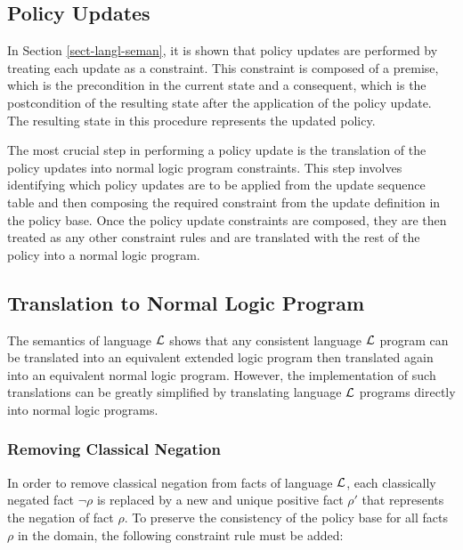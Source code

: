 \documentclass[11pt]{report}
\begin{document}
      \subsection{Policy Updates}
        \label{subs-polup-polup}

        In Section \ref{sect-langl-seman}, it is shown that policy updates are
        performed by treating each update as a constraint. This constraint is
        composed of a premise, which is the precondition in the current state
        and a consequent, which is the postcondition of the resulting state
        after the application of the policy update. The resulting state in this
        procedure represents the updated policy.

        The most crucial step in performing a policy update is the translation
        of the policy updates into normal logic program constraints. This step
        involves identifying which policy updates are to be applied from the
        update sequence table and then composing the required constraint from
        the update definition in the policy base. Once the policy update
        constraints are composed, they are then treated as any other
        constraint rules and are translated with the rest of the policy into
        a normal logic program.

      \subsection{Translation to Normal Logic Program}
        \label{subs-polup-norlp}

        The semantics of language ${\cal L}$ shows that any consistent language
        ${\cal L}$ program can be translated into an equivalent extended logic
        program then translated again into an equivalent normal logic program.
        However, the implementation of such translations can be greatly
        simplified by translating language ${\cal L}$ programs directly into
        normal logic programs.

        \subsubsection{Removing Classical Negation}

          In order to remove classical negation from facts of language
          ${\cal L}$, each classically negated fact $\lnot$$\rho$ is replaced
          by a new and unique positive fact $\rho'$ that represents the
          negation of fact $\rho$. To preserve the consistency of the policy
          base for all facts $\rho$ in the domain, the following constraint
          rule must be added:
\end{document}

